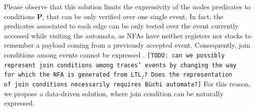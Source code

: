 Please observe that this solution limits the expressivity of the nodes predicates to conditions $\mathbf{P}_i$ that can be only verified over one single event. In fact, the predicates associated to each edge can be only tested over the event currently accessed while visiting the automata, as NFAs have neither registers nor stacks to remember a payload coming from a previously accepted event. Consequently, join conditions among events cannot be expressed \cite{SchonigCMM16}. \texttt{\color{red}[TODO: can we possibly represent join conditions among traces' events by changing the way\\ for which the NFA is generated from LTL$_f$? Does the representation\\ of join conditions necessarily requires Büchi automata?]} For this reason, we propose a data-driven solution, where join condition can be naturally expressed.




